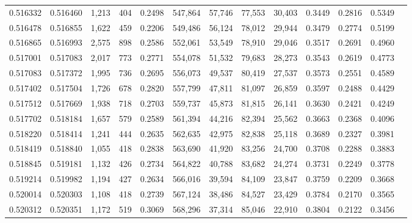 \begin{tabular}{rrrrrrrrrrrrr}
0.516332 & 0.516460 &  1,213 &   404 &                                     0.2498 & 547,864 &  57,746 &  77,553 &  30,403 & 0.3449 & 0.2816 & 0.5349 \\
0.516478 & 0.516855 &  1,622 &   459 &                                     0.2206 & 549,486 &  56,124 &  78,012 &  29,944 & 0.3479 & 0.2774 & 0.5199 \\
0.516865 & 0.516993 &  2,575 &   898 &                                     0.2586 & 552,061 &  53,549 &  78,910 &  29,046 & 0.3517 & 0.2691 & 0.4960 \\
0.517001 & 0.517083 &  2,017 &   773 &                                     0.2771 & 554,078 &  51,532 &  79,683 &  28,273 & 0.3543 & 0.2619 & 0.4773 \\
0.517083 & 0.517372 &  1,995 &   736 &                                     0.2695 & 556,073 &  49,537 &  80,419 &  27,537 & 0.3573 & 0.2551 & 0.4589 \\
0.517402 & 0.517504 &  1,726 &   678 &                                     0.2820 & 557,799 &  47,811 &  81,097 &  26,859 & 0.3597 & 0.2488 & 0.4429 \\
0.517512 & 0.517669 &  1,938 &   718 &                                     0.2703 & 559,737 &  45,873 &  81,815 &  26,141 & 0.3630 & 0.2421 & 0.4249 \\
0.517702 & 0.518184 &  1,657 &   579 &                                     0.2589 & 561,394 &  44,216 &  82,394 &  25,562 & 0.3663 & 0.2368 & 0.4096 \\
0.518220 & 0.518414 &  1,241 &   444 &                                     0.2635 & 562,635 &  42,975 &  82,838 &  25,118 & 0.3689 & 0.2327 & 0.3981 \\
0.518419 & 0.518840 &  1,055 &   418 &                                     0.2838 & 563,690 &  41,920 &  83,256 &  24,700 & 0.3708 & 0.2288 & 0.3883 \\
0.518845 & 0.519181 &  1,132 &   426 &                                     0.2734 & 564,822 &  40,788 &  83,682 &  24,274 & 0.3731 & 0.2249 & 0.3778 \\
0.519214 & 0.519982 &  1,194 &   427 &                                     0.2634 & 566,016 &  39,594 &  84,109 &  23,847 & 0.3759 & 0.2209 & 0.3668 \\
0.520014 & 0.520303 &  1,108 &   418 &                                     0.2739 & 567,124 &  38,486 &  84,527 &  23,429 & 0.3784 & 0.2170 & 0.3565 \\
0.520312 & 0.520351 &  1,172 &   519 &                                     0.3069 & 568,296 &  37,314 &  85,046 &  22,910 & 0.3804 & 0.2122 & 0.3456 \\

\end{tabular}
